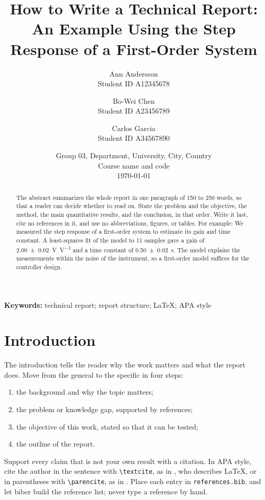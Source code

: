 \documentclass[10pt,a4paper,twocolumn]{article}
\title{How to Write a Technical Report:\\
  \large An Example Using the Step Response of a First-Order System}
\author{%
  Ann Andersson\\ \small Student ID A12345678
  \and
  Bo-Wei Chen\\ \small Student ID A23456789
  \and
  Carlos Garcia\\ \small Student ID A34567890}
\date{\small Group 03, Department, University, City, Country \\
  \small Course name and code \\[1ex]
  \today}
\begin{document}
\maketitle

\begin{abstract}
The abstract summarizes the whole report in one paragraph of 150 to 250 words, so that a reader can decide whether to read on.
State the problem and the objective, the method, the main quantitative results, and the conclusion, in that order.
Write it last, cite no references in it, and use no abbreviations, figures, or tables.
For example: We measured the step response of a first-order system to estimate its gain and time constant.
A least-squares fit of the model to 11 samples gave a gain of \qty{2.00(2)}{\volt\per\volt} and a time constant of \qty{0.50(2)}{\second}.
The model explains the measurements within the noise of the instrument, so a first-order model suffices for the controller design.
\end{abstract}

\noindent\textbf{Keywords:} technical report; report structure; \LaTeX; APA style

\tableofcontents

\section{Introduction}
\label{sec:introduction}

The introduction tells the reader why the work matters and what the report does.
Move from the general to the specific in four steps:
\begin{enumerate}
  \item the background and why the topic matters;
  \item the problem or knowledge gap, supported by references;
  \item the objective of this work, stated so that it can be tested;
  \item the outline of the report.
\end{enumerate}

Support every claim that is not your own result with a citation.
In APA style, cite the author in the sentence with \verb|\textcite|, as in \textcite{lamport1994LaTeXPreparationAddisonWesley}, who describes \LaTeX{}, or in parentheses with \verb|\parencite|, as in \parencite{knuth1984LiterateProgrammingComputJ}.
Place each entry in \texttt{references.bib}, and let biber build the reference list;
never type a reference by hand.
\end{document}
